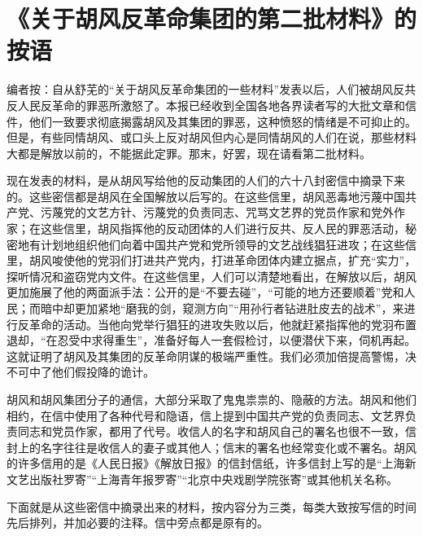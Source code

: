 \section[《关于胡风反革命集团的第二批材料》的按语（一九五五年五月二十四日）]{《关于胡风反革命集团的第二批材料》的按语}


编者按：自从舒芜的“关于胡风反革命集团的一些材料”发表以后，人们被胡风反共反人民反革命的罪恶所激怒了。本报已经收到全国各地各界读者写的大批文章和信件，他们一致要求彻底揭露胡风及其集团的罪恶，这种愤怒的情绪是不可抑止的。但是，有些同情胡风、或口头上反对胡风但内心是同情胡风的人们在说，那些材料大都是解放以前的，不能据此定罪。那末，好罢，现在请看第二批材料。

现在发表的材料，是从胡风写给他的反动集团的人们的六十八封密信中摘录下来的。这些密信都是胡风在全国解放以后写的。在这些信里，胡风恶毒地污蔑中国共产党、污蔑党的文艺方针、污蔑党的负责同志、咒骂文艺界的党员作家和党外作家；在这些信里，胡风指挥他的反动团体的人们进行反共、反人民的罪恶活动，秘密地有计划地组织他们向着中国共产党和党所领导的文艺战线猖狂进攻；在这些信里，胡风唆使他的党羽们打进共产党内，打进革命团体内建立据点，扩充“实力”，探听情况和盗窃党内文件。在这些信里，人们可以清楚地看出，在解放以后，胡风更加施展了他的两面派手法：公开的是“不要去碰”，“可能的地方还要顺着”党和人民；而暗中却更加紧地“磨我的剑，窥测方向”“用孙行者钻进肚皮去的战术”，来进行反革命的活动。当他向党举行猖狂的进攻失败以后，他就赶紧指挥他的党羽布置退却，“在忍受中求得重生”，准备好每人一套假检讨，以便潜伏下来，伺机再起。这就证明了胡风及其集团的反革命阴谋的极端严重性。我们必须加倍提高警惕，决不可中了他们假投降的诡计。

胡风和胡风集团分子的通信，大部分采取了鬼鬼祟祟的、隐蔽的方法。胡风和他们相约，在信中使用了各种代号和隐语，信上提到中国共产党的负责同志、文艺界负责同志和党员作家，都用了代号。收信人的名字和胡风自己的署名也很不一致，信封上的名字往往是收信人的妻子或其他人；信末的署名也经常变化或不署名。胡风的许多信用的是《人民日报》《解放日报》的信封信纸，许多信封上写的是“上海新文艺出版社罗寄”“上海青年报罗寄”“北京中央戏剧学院张寄”或其他机关名称。

下面就是从这些密信中摘录出来的材料，按内容分为三类，每类大致按写信的时间先后排列，并加必要的注释。信中旁点都是原有的。

